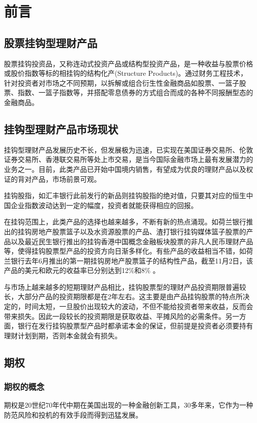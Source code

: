 \chapter{前言}

\section{股票挂钩型理财产品}

股票挂钩投资品，又称连动式投资产品或结构型投资产品，是一种收益与股票价格或股价指数等标的相挂钩的结构化产(Structure Products)。通过财务工程技术，针对投资者对市场之不同预期，以拆解或组合衍生性金融商品如股票、一篮子股票、指数、一篮子指数等，并搭配零息债券的方式组合而成的各种不同报酬型态的金融商品。\cite{optionpricing}

\section{挂钩型理财产品市场现状}

挂钩型理财产品发展历史不长，但发展极为迅速，已实现在美国证券交易所、伦敦证券交易所、香港联交易所等处上市交易，是当今国际金融市场上最有发展潜力的业务之一。目前，此类产品已开始中国境内销售，有望成为优良的理财产品以及权证的背对产品，市场前景可观。\cite{On-Manifold-Regularization}

挂钩股指，如汇丰银行此前发行的新品则挂钩股指的绝对值，只要其对应的恒生中国企业指数波动达到一定的幅度，投资者就能获得相应的回报。

在挂钩范围上，此类产品的选择也越来越多，不断有新的热点涌现。如荷兰银行推出的挂钩房地产股票篮子以及水资源股票的产品、渣打银行挂钩媒体篮子股票的产品以及最近民生银行推出的挂钩香港中国概念金融板块股票的非凡人民币理财产品等，使得挂钩股票型产品的投资方向日渐多样化。有些产品的收益相当不错，如荷兰银行去年6月推出的第一期挂钩房地产股票篮子的结构性产品，截至11月2日，该产品的美元和欧元的收益率已分别达到12\%和8\% 。

与市场上越来越多的短期理财产品相比，挂钩股票型的理财产品投资期限普遍较长，大部分产品的投资期限都是在2年左右。这主要是由产品挂钩股票的特点所决定的，时间太短，一旦股价出现较大的波动，不但不能给投资者带来收益，反而会带来损失。因此一段较长的投资期限是获取收益、平摊风险的必需条件。另一方面，银行在发行挂钩股票型产品时都承诺本金的保证，但前提是投资者必须要持有理财计划到期，否则本金就会有损失。

\section{期权}
\subsection{期权的概念}
期权是20世纪70年代中期在美国出现的一种金融创新工具，30多年来，它作为一种防范风险和投机的有效手段而得到迅猛发展。

